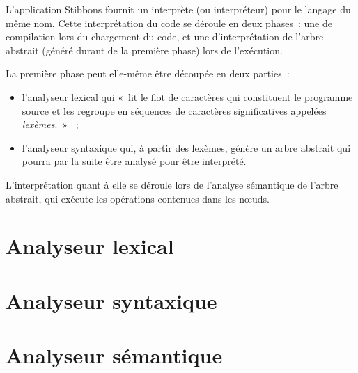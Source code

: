 L'application Stibbons fournit un interprète (ou interpréteur) pour le langage du même nom. Cette interprétation du code se déroule en deux phases~: une de compilation lors du chargement du code, et une d'interprétation de l'arbre abstrait (généré durant de la première phase) lors de l'exécution.

La première phase peut elle-même être découpée en deux parties~:
\begin{itemize}
\item l'analyseur lexical qui «~lit le flot de caractères qui constituent le programme source et les regroupe en séquences de caractères significatives appelées \emph{lexèmes}.~» \cite{compilateurs}~;
\item l'analyseur syntaxique qui, à partir des lexèmes, génère un arbre abstrait qui pourra par la suite être analysé pour être interprété.
\end{itemize}

L'interprétation quant à elle se déroule lors de l'analyse sémantique de l'arbre abstrait, qui exécute les opérations contenues dans les nœuds.

\section{Analyseur lexical}
\label{analyse-lexicale}


\section{Analyseur syntaxique}
\label{analyse-syntaxique}


\section{Analyseur sémantique}
\label{Analyseur sémantique}

